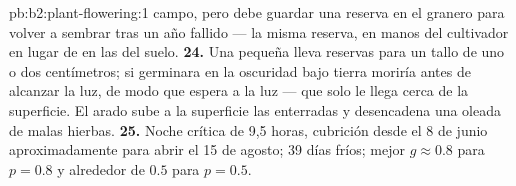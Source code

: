 \begin{solution}{pb:b2:plant-flowering:1}
campo, pero debe guardar una reserva en el granero para volver a sembrar
tras un año fallido --- la misma reserva, en manos del cultivador en lugar
de en las del suelo.
\textbf{24.} Una  pequeña lleva reservas para un tallo de uno o dos
centímetros; si germinara en la oscuridad bajo tierra moriría antes de
alcanzar la luz, de modo que espera a la luz --- que solo le llega cerca de
la superficie. El arado sube a la superficie las  enterradas y
desencadena una oleada de malas hierbas.
\textbf{25.} Noche crítica de 9,5 horas, cubrición desde el 8 de junio
aproximadamente para abrir el 15 de agosto; 39 días fríos; mejor
$g \approx 0.8$ para $p = 0.8$ y alrededor de $0.5$ para $p = 0.5$.
\end{solution}
